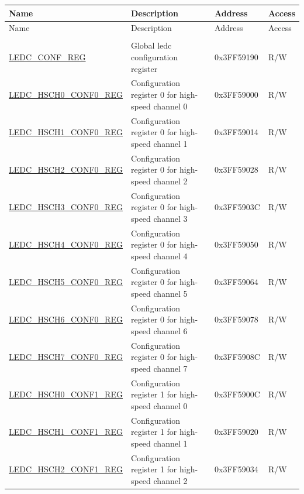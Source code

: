\begin{longtable}{ | p{4.7cm} | p{7.3cm} | p{2cm} | p{1cm} | }
\hline\rowcolor{lightgray}
Name & Description &  Address & Access \\ \hline
\endfirsthead
        \hline
        \rowcolor{lightgray}
       Name & Description &  Address & Access \\
        \hline
        \endhead
        \endfoot
\multicolumn{4}{|l|}{\textbf{Configuration registers}} \\ \hline
\hyperref[regdesc:LEDCCONFREG]{LEDC\_CONF\_REG} & Global ledc configuration register & 0x3FF59190 & R/W \\ \hline
\hyperref[regdesc:LEDCHSCHnCONF0REG]{LEDC\_HSCH0\_CONF0\_REG} & Configuration register 0 for high-speed channel 0 & 0x3FF59000 & R/W \\ \hline
\hyperref[regdesc:LEDCHSCHnCONF0REG]{LEDC\_HSCH1\_CONF0\_REG} & Configuration register 0 for high-speed channel 1 & 0x3FF59014 & R/W \\ \hline
\hyperref[regdesc:LEDCHSCHnCONF0REG]{LEDC\_HSCH2\_CONF0\_REG} & Configuration register 0 for high-speed channel 2 & 0x3FF59028 & R/W \\ \hline
\hyperref[regdesc:LEDCHSCHnCONF0REG]{LEDC\_HSCH3\_CONF0\_REG} & Configuration register 0 for high-speed channel 3 & 0x3FF5903C & R/W \\ \hline
\hyperref[regdesc:LEDCHSCHnCONF0REG]{LEDC\_HSCH4\_CONF0\_REG} & Configuration register 0 for high-speed channel 4 & 0x3FF59050 & R/W \\ \hline
\hyperref[regdesc:LEDCHSCHnCONF0REG]{LEDC\_HSCH5\_CONF0\_REG} & Configuration register 0 for high-speed channel 5 & 0x3FF59064 & R/W \\ \hline
\hyperref[regdesc:LEDCHSCHnCONF0REG]{LEDC\_HSCH6\_CONF0\_REG} & Configuration register 0 for high-speed channel 6 & 0x3FF59078 & R/W \\ \hline
\hyperref[regdesc:LEDCHSCHnCONF0REG]{LEDC\_HSCH7\_CONF0\_REG} & Configuration register 0 for high-speed channel 7 & 0x3FF5908C & R/W \\ \hline
\hyperref[regdesc:LEDCHSCHnCONF1REG]{LEDC\_HSCH0\_CONF1\_REG} & Configuration register 1 for high-speed channel 0 & 0x3FF5900C & R/W \\ \hline
\hyperref[regdesc:LEDCHSCHnCONF1REG]{LEDC\_HSCH1\_CONF1\_REG} & Configuration register 1 for high-speed channel 1 & 0x3FF59020 & R/W \\ \hline
\hyperref[regdesc:LEDCHSCHnCONF1REG]{LEDC\_HSCH2\_CONF1\_REG} & Configuration register 1 for high-speed channel 2 & 0x3FF59034 & R/W \\ \hline

\end{longtable}

